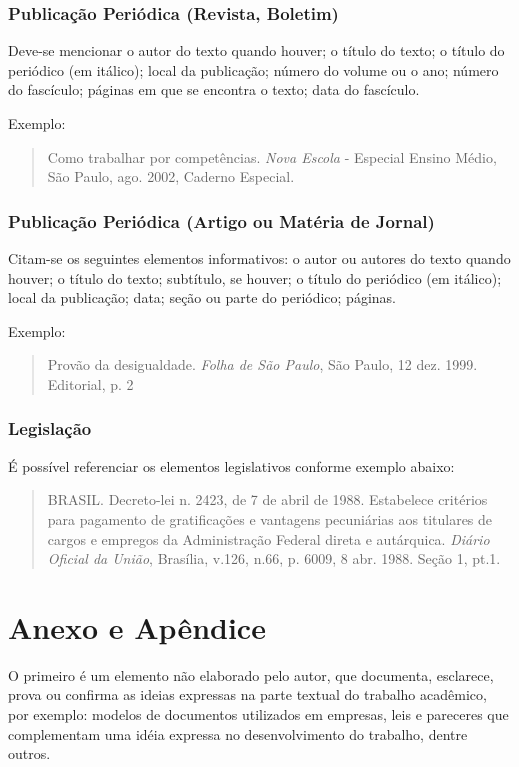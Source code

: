 \documentclass[
	12pt,				%
	openright,			%
	oneside,			%
	a4paper,			%
	english,			%
	french,				%
	spanish,			%
	brazil				%
	]{abntex2}
\begin{document}
\subsubsection{Publicação Periódica (Revista, Boletim)}

\par Deve-se mencionar o autor do texto quando houver; o título do texto; o título do periódico (em itálico); local da publicação; número do volume ou o ano; número do fascículo; páginas em que se encontra o texto; data do fascículo.
\par Exemplo:
\begin{quote}
Como trabalhar por competências. \textit{Nova Escola} - Especial Ensino Médio, São Paulo, ago. 2002, Caderno Especial.
\end{quote}

\subsubsection{Publicação Periódica (Artigo ou Matéria de Jornal)}
\par Citam-se os seguintes elementos informativos: o autor ou autores do texto quando houver; o título do texto; subtítulo, se houver; o título do periódico (em itálico); local da publicação; data; seção ou parte do periódico; páginas.
\par Exemplo:
\begin{quote}
Provão da desigualdade. \textit{Folha de São Paulo}, São Paulo, 12 dez. 1999. Editorial, p. 2
\end{quote}

\subsubsection{Legislação}

\par É possível referenciar os elementos legislativos conforme exemplo abaixo: 
\begin{quote}
BRASIL. Decreto-lei n. 2423, de 7 de abril de 1988. Estabelece critérios para pagamento de gratificações e vantagens pecuniárias aos titulares de cargos e empregos da Administração Federal direta e autárquica. \textit{Diário Oficial da União}, Brasília, v.126, n.66, p. 6009, 8 abr. 1988. Seção 1, pt.1.
\end{quote}

\section{Anexo e Apêndice}
\par O primeiro é um elemento não elaborado pelo autor, que documenta, esclarece, prova ou confirma as ideias expressas na parte textual do trabalho acadêmico, por exemplo: modelos de documentos utilizados em empresas, leis e pareceres que complementam uma idéia expressa no desenvolvimento do trabalho, dentre outros.
\end{document}
